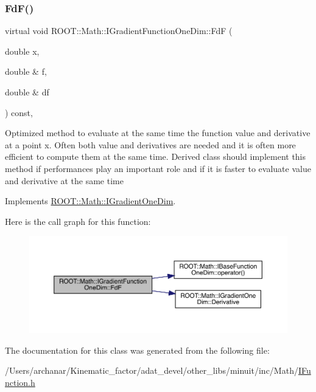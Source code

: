 \subsubsection{\texorpdfstring{FdF()}{FdF()}\hspace{0.1cm}{\footnotesize\ttfamily [2/2]}}
{\footnotesize\ttfamily virtual void R\+O\+O\+T\+::\+Math\+::\+I\+Gradient\+Function\+One\+Dim\+::\+FdF (\begin{DoxyParamCaption}\item[{double}]{x,  }\item[{double \&}]{f,  }\item[{double \&}]{df }\end{DoxyParamCaption}) const\hspace{0.3cm}{\ttfamily [inline]}, {\ttfamily [virtual]}}

Optimized method to evaluate at the same time the function value and derivative at a point x. Often both value and derivatives are needed and it is often more efficient to compute them at the same time. Derived class should implement this method if performances play an important role and if it is faster to evaluate value and derivative at the same time 

Implements \mbox{\hyperlink{classROOT_1_1Math_1_1IGradientOneDim_aef5560ea7d43e64d94bf875713e2a5fc}{R\+O\+O\+T\+::\+Math\+::\+I\+Gradient\+One\+Dim}}.

Here is the call graph for this function\+:
\nopagebreak
\begin{figure}[H]
\begin{center}
\leavevmode
\includegraphics[width=350pt]{d5/d75/classROOT_1_1Math_1_1IGradientFunctionOneDim_a01eaedb2ae1dfa5722f11281acf7a72b_cgraph}
\end{center}
\end{figure}


The documentation for this class was generated from the following file\+:\begin{DoxyCompactItemize}
\item 
/\+Users/archanar/\+Kinematic\+\_\+factor/adat\+\_\+devel/other\+\_\+libs/minuit/inc/\+Math/\mbox{\hyperlink{other__libs_2minuit_2inc_2Math_2IFunction_8h}{I\+Function.\+h}}\end{DoxyCompactItemize}
